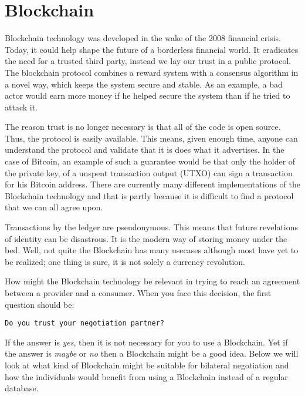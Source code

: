 \chapter{Blockchain}

Blockchain technology was developed in the wake of the 2008 financial crisis. Today, it could help shape the future of a borderless financial world. It eradicates the need for a trusted third party, instead we lay our trust in a public protocol. The blockchain protocol combines a reward system with a consensus algorithm in a novel way, which keeps the system secure and stable. As an example, a bad actor would earn more money if he helped secure the system than if he tried to attack it.

The reason trust is no longer necessary is that all of the code is open source. Thus, the protocol is easily available. This means, given enough time, anyone can understand the protocol and validate that it is does what it advertises. In the case of Bitcoin, an example of such a guarantee would be that only the holder of the private key, of a unspent transaction output (UTXO) can sign a transaction for his Bitcoin address. There are currently many different implementations of the Blockchain technology and that is partly because it is difficult to find a protocol that we can all agree upon.

Transactions by the ledger are pseudonymous. This means that future revelations of identity can be disastrous. It is the modern way of storing money under the bed. Well, not quite the Blockchain has many usecases although most have yet to be realized; one thing is sure, it is not solely a currency revolution.

How might the Blockchain technology be relevant in trying to reach an agreement between a provider and a consumer. When you face this decision, the first question should be:
\begin{verbatim}
Do you trust your negotiation partner? 
\end{verbatim}
If the answer is \emph{yes}, then it is not necessary for you to use a Blockchain. Yet if the answer is \emph{maybe} or \emph{no} then a Blockchain might be a good idea. Below we will look at what kind of Blockchain might be suitable for bilateral negotiation and how the individuals would benefit from using a Blockchain instead of a regular database.


